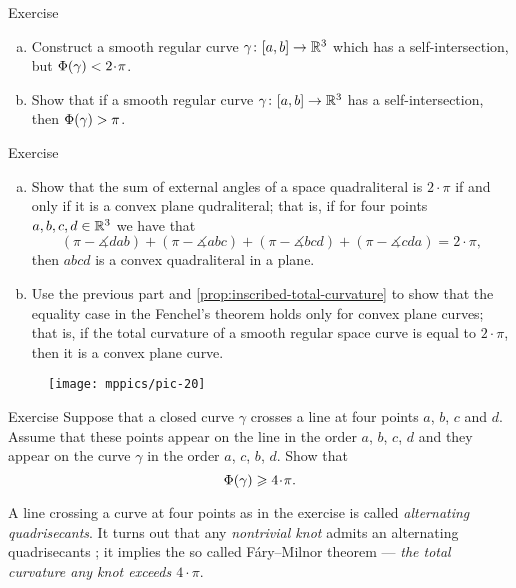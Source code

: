 \begin{thm}{Exercise}
\begin{enumerate}[(a)]
\item Construct a smooth regular curve $\gamma\colon[a,b]\to\mathbb{R}^3$ which has a self-intersection, but $\tc\gamma<2\cdot\pi$.
\item Show that if a smooth regular curve $\gamma\colon[a,b]\to\mathbb{R}^3$ has a self-intersection, then $\Phi({\gamma})>\pi$.
\end{enumerate}
\end{thm}

\begin{thm}{Exercise}\label{ex:fenchel=}
\begin{enumerate}[(a)]
 \item Show that the sum of external angles of a space quadraliteral is $2\cdot\pi$ if and only if it is a convex plane qudraliteral;
 that is, if for four points $a,b,c,d\in\mathbb{R}^3$ we have that 
 \[(\pi-\measuredangle dab)+(\pi-\measuredangle abc)+(\pi-\measuredangle bcd)+(\pi-\measuredangle cda)=2\cdot\pi,\]
 then $abcd$ is a convex quadraliteral in a plane. 

 \item\label{ex:fenchel==} Use the previous part and \ref{prop:inscribed-total-curvature} to show that
 the equality case in the Fenchel's theorem holds only for convex plane curves;
that is, if the total curvature of a smooth regular space curve is equal to $2\cdot\pi$, then it is a convex plane curve.
\end{enumerate}
\end{thm}

\begin{wrapfigure}{r}{30 mm}
\vskip-0mm
\centering
\texttt{[image: mppics/pic-20]}
\vskip0mm
\end{wrapfigure}

\begin{thm}{Exercise}
Suppose that a closed curve $\gamma$ crosses a line at four points $a$, $b$, $c$ and $d$.
Assume that these points appear on the line in the order $a$, $b$, $c$, $d$
and they appear on the curve $\gamma$ in the order $a$, $c$, $b$, $d$.
Show that 
\[\tc\gamma\ge 4\cdot\pi.\]

\end{thm}

A line crossing a curve at four points as in the exercise is called \emph{alternating quadrisecants}.
It turns out that any \emph{nontrivial knot} admits an alternating quadrisecants \cite{denne};
it implies the so called F\'ary--Milnor theorem --- \emph{the total curvature any knot exceeds $4\cdot \pi$}.

